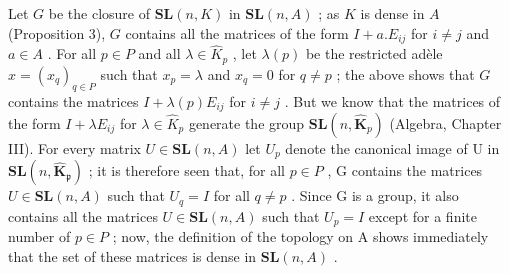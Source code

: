 Let \(G\) be the closure of \(\mathbf{SL}(n, K)\) in \(\mathbf{SL}(n, A)\) ; as \(K\) is dense in \(A\) (Proposition 3), \(G\) contains all the matrices of the form \(I + a.E_{ij}\) for \(i \neq j\) and \(a \in A\) . For all \(p \in P\) and all \(\lambda \in \hat{K}_p\) , let \(\lambda(p)\) be the restricted adèle \(x = (x_q)_{q \in P}\) such that \(x_p = \lambda\) and \(x_q = 0\) for \(q \neq p\) ; the above shows that \(G\) contains the matrices \(I + \lambda(p)E_{ij}\) for \(i \neq j\) . But we know that the matrices of the form \(I + \lambda E_{ij}\) for \(\lambda \in \hat{K}_p\) generate the group \(\mathbf{SL}(n, \hat{\mathbf{K}}_p)\) (Algebra, Chapter III). For every matrix \(U \in \mathbf{SL}(n, A)\) let \(U_{p}\) denote the canonical image of U in \(\mathbf{SL}(n, \hat{\mathbf{K}}_{\mathfrak{p}})\) ; it is therefore seen that, for all \(p \in P\) , G contains the matrices \(U \in \mathbf{SL}(n, A)\) such that \(U_{q} = I\) for all \(q \neq p\) . Since G is a group, it also contains all the matrices \(U \in \mathbf{SL}(n, A)\) such that \(U_{p} = I\) except for a finite number of \(p \in P\) ; now, the definition of the topology on A shows immediately that the set of these matrices is dense in \(\mathbf{SL}(n, A)\) .

